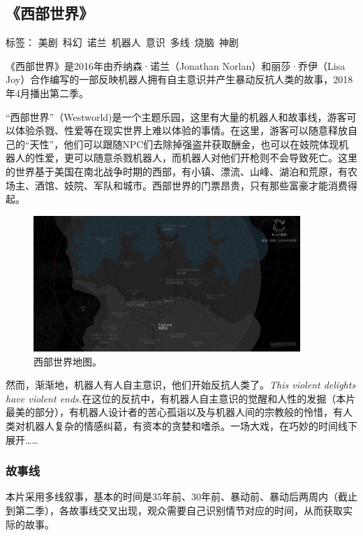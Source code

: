 \subsection{《西部世界》}

标签： 美剧\  科幻\ 诺兰\ 机器人\ 意识\ 多线\ 烧脑\ 神剧


《西部世界》是2016年由乔纳森·诺兰（Jonathan Norlan）和丽莎·乔伊（Lisa Joy）合作编写的一部反映机器人拥有自主意识并产生暴动反抗人类的故事，2018年4月播出第二季。

“西部世界”（Westworld)是一个主题乐园，这里有大量的机器人和故事线，游客可以体验杀戮、性爱等在现实世界上难以体验的事情。在这里，游客可以随意释放自己的“天性”，他们可以跟随NPC们去除掉强盗并获取酬金，也可以在妓院体现机器人的性爱，更可以随意杀戮机器人，而机器人对他们开枪则不会导致死亡。这里的世界基于美国在南北战争时期的西部，有小镇、漂流、山峰、湖泊和荒原，有农场主、酒馆、妓院、军队和城市。西部世界的门票昂贵，只有那些富豪才能消费得起。

\begin{figure}[htpb]
\centering
\includegraphics[width=0.9\textwidth]{images/xbsj.png}
\caption{西部世界地图。}
\end{figure}

然而，渐渐地，机器人有人自主意识，他们开始反抗人类了。\emph{This violent delights have violent ends.}在这位的反抗中，有机器人自主意识的觉醒和人性的发掘（本片最美的部分），有机器人设计者的苦心孤诣以及与机器人间的宗教般的怜惜，有人类对机器人复杂的情感纠葛，有资本的贪婪和嗜杀。一场大戏，在巧妙的时间线下展开……

\subsubsection{故事线}
本片采用多线叙事，基本的时间是35年前、30年前、暴动前、暴动后两周内（截止到第二季），各故事线交叉出现，观众需要自己识别情节对应的时间，从而获取实际的故事。

